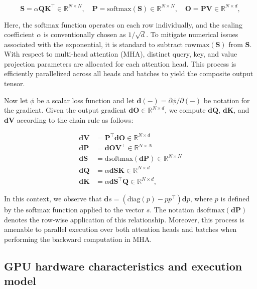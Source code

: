 \begin{equation*}
  \mathbf{S} = \alpha \mathbf{Q} \mathbf{K}^\top \in \mathbb{R}^{N \times N}, \quad \mathbf{P} = \mathrm{softmax}(\mathbf{S}) \in \mathbb{R}^{N \times N}, \quad \mathbf{O} = \mathbf{P}\mathbf{V} \in \mathbb{R}^{N \times d},
\end{equation*}

Here, the $\mathrm{softmax}$ function operates on each row individually, and the scaling coefficient $\alpha$ is conventionally chosen as $1/\sqrt{d}$. To mitigate numerical issues associated with the exponential, it is standard to subtract $\mathrm{rowmax}(\mathbf{S})$ from $\mathbf{S}$. With respect to multi-head attention (MHA), distinct query, key, and value projection parameters are allocated for each attention head. This process is efficiently parallelized across all heads and batches to yield the composite output tensor.

Now let $\phi$ be a scalar loss function and let $\mathbf{d}(-) = \partial \phi / \partial (-)$ be notation for the gradient. Given the output gradient $\mathbf{dO} \in \mathbb{R}^{N \times d}$, we compute $\mathbf{dQ}$, $\mathbf{dK}$, and $\mathbf{dV}$ according to the chain rule as follows:

\begin{align*}
  \mathbf{dV} &= \mathbf{P}^\top \mathbf{dO} \in \mathbb{R}^{N \times d} \\
  \mathbf{dP} &= \mathbf{dO} \mathbf{V}^\top \in \mathbb{R}^{N \times N} \\
  \mathbf{dS} &= \mathrm{dsoftmax} (\mathbf{dP}) \in \mathbb{R}^{N \times N} \\
  \mathbf{dQ} &= \alpha \mathbf{dS} \mathbf{K} \in \mathbb{R}^{N \times d} \\
  \mathbf{dK} &= \alpha \mathbf{dS}^\top \mathbf{Q} \in \mathbb{R}^{N \times d},
\end{align*}

In this context, we observe that $\mathbf{d}s = (\mathrm{diag}(p) - p p^\top)\mathbf{d}p$, where $p$ is defined by the softmax function applied to the vector $s$. The notation $\mathrm{dsoftmax}(\mathbf{dP})$ denotes the row-wise application of this relationship. Moreover, this process is amenable to parallel execution over both attention heads and batches when performing the backward computation in MHA.

\subsection{GPU hardware characteristics and execution model}
\label{subsec:hardware}

